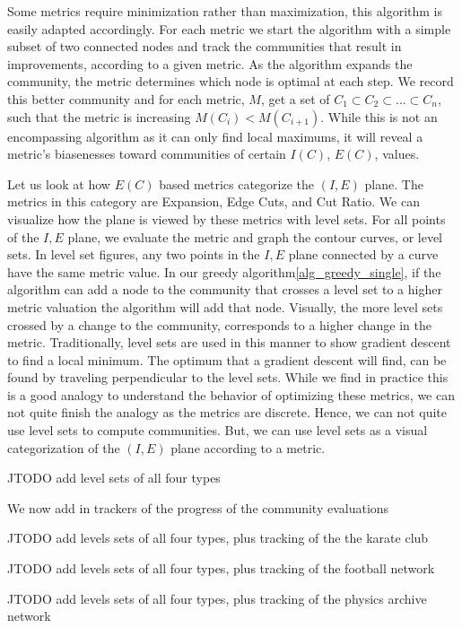 \documentclass[phd,tocprelim]{cornell}
\begin{document}
Some metrics require minimization rather than maximization, this algorithm is easily adapted accordingly.
For each metric we start the algorithm with a simple subset of two connected nodes and track the communities that result in improvements, according to a given metric. As the algorithm expands the community, the metric determines which node is optimal at each step. We record this better community and for each metric, $M$, get a set of $C_1 \subset C_2 \subset \dots \subset C_n$, such that the metric is increasing $M(C_i) < M(C_{i+1})$. While this is not an encompassing algorithm as it can only find local maximums, it will reveal a metric’s biasenesses toward communities of certain $I(C)$, $E(C)$, values.

Let us look at how $E(C)$ based metrics categorize the $(I, E)$ plane.  The metrics in this category are {\sc Expansion}, {\sc Edge Cuts}, and {\sc Cut Ratio}.  We can visualize how the plane is viewed by these metrics with level sets.  For all points of the $I,E$ plane, we evaluate the metric and graph the contour curves, or level sets\cite{}.  In level set figures, any two points in the $I,E$ plane connected by a curve have the same metric value. In our greedy algorithm\ref{alg_greedy_single}, if the algorithm can add a node to the community that crosses a level set to a higher metric valuation the algorithm will add that node.  Visually, the more level sets crossed by a change to the community, corresponds to a higher change in the metric.  Traditionally, level sets are used in this manner to show gradient descent to find a local minimum.  The optimum that a gradient descent will find, can be found by traveling perpendicular to the level sets.  While we find in practice this is a good analogy to understand the behavior of optimizing these metrics,  we can not quite finish the analogy as the metrics are discrete.  Hence, we can not quite use level sets to compute communities.  But, we can use level sets as a visual categorization of the $(I, E)$ plane according to a metric.

JTODO add level sets of all four types

We now add in trackers of the progress of the community evaluations

JTODO add levels sets of all four types, plus tracking of the the karate club

JTODO add levels sets of all four types, plus tracking of the football network

JTODO add levels sets of all four types, plus tracking of the physics archive network
\end{document}
